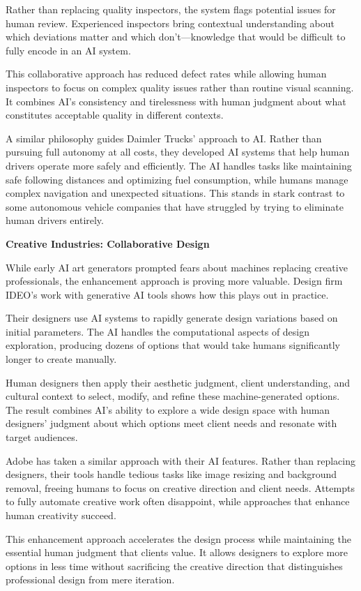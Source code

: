 \documentclass[
  Letterpaper,
]{scrbook}
\begin{document}
Rather than replacing quality inspectors, the system flags potential
issues for human review. Experienced inspectors bring contextual
understanding about which deviations matter and which don't---knowledge
that would be difficult to fully encode in an AI system.

This collaborative approach has reduced defect rates while allowing
human inspectors to focus on complex quality issues rather than routine
visual scanning. It combines AI's consistency and tirelessness with
human judgment about what constitutes acceptable quality in different
contexts.

A similar philosophy guides Daimler Trucks' approach to AI. Rather than
pursuing full autonomy at all costs, they developed AI systems that help
human drivers operate more safely and efficiently. The AI handles tasks
like maintaining safe following distances and optimizing fuel
consumption, while humans manage complex navigation and unexpected
situations. This stands in stark contrast to some autonomous vehicle
companies that have struggled by trying to eliminate human drivers
entirely.

\textbf{Creative Industries: Collaborative Design}

While early AI art generators prompted fears about machines replacing
creative professionals, the enhancement approach is proving more
valuable. Design firm IDEO's work with generative AI tools shows how
this plays out in practice.

Their designers use AI systems to rapidly generate design variations
based on initial parameters. The AI handles the computational aspects of
design exploration, producing dozens of options that would take humans
significantly longer to create manually.

Human designers then apply their aesthetic judgment, client
understanding, and cultural context to select, modify, and refine these
machine-generated options. The result combines AI's ability to explore a
wide design space with human designers' judgment about which options
meet client needs and resonate with target audiences.

Adobe has taken a similar approach with their AI features. Rather than
replacing designers, their tools handle tedious tasks like image
resizing and background removal, freeing humans to focus on creative
direction and client needs. Attempts to fully automate creative work
often disappoint, while approaches that enhance human creativity
succeed.

This enhancement approach accelerates the design process while
maintaining the essential human judgment that clients value. It allows
designers to explore more options in less time without sacrificing the
creative direction that distinguishes professional design from mere
iteration.
\end{document}
